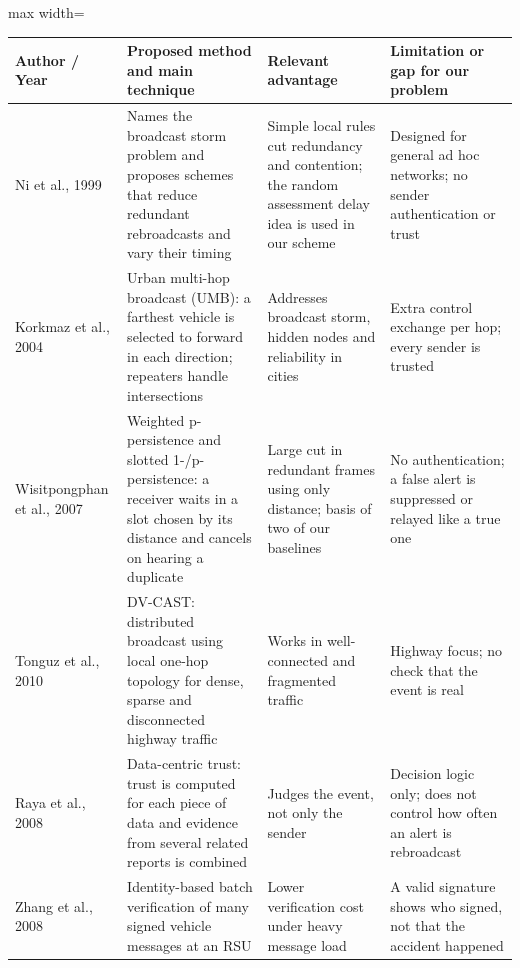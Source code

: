 \documentclass[11pt, a4paper]{article}
\begin{document}
\begin{table}[htbp]
\centering
\footnotesize
\renewcommand{\arraystretch}{1.25}
\begin{adjustbox}{max width=\textwidth}
\begin{tabular}{|>{\raggedright\arraybackslash}p{2.5cm}|>{\raggedright\arraybackslash}p{4.6cm}|>{\raggedright\arraybackslash}p{3.9cm}|>{\raggedright\arraybackslash}p{4.0cm}|}
\hline
\textbf{Author / Year} & \textbf{Proposed method and main technique} & \textbf{Relevant advantage} & \textbf{Limitation or gap for our problem} \\
\hline
Ni et al., 1999 \cite{ni1999broadcast} & Names the broadcast storm problem and proposes schemes that reduce redundant rebroadcasts and vary their timing & Simple local rules cut redundancy and contention; the random assessment delay idea is used in our scheme & Designed for general ad hoc networks; no sender authentication or trust \\
\hline
Korkmaz et al., 2004 \cite{korkmaz2004umb} & Urban multi-hop broadcast (UMB): a farthest vehicle is selected to forward in each direction; repeaters handle intersections & Addresses broadcast storm, hidden nodes and reliability in cities & Extra control exchange per hop; every sender is trusted \\
\hline
Wisitpongphan et al., 2007 \cite{wisitpongphan2007} & Weighted p-persistence and slotted 1-/p-persistence: a receiver waits in a slot chosen by its distance and cancels on hearing a duplicate & Large cut in redundant frames using only distance; basis of two of our baselines & No authentication; a false alert is suppressed or relayed like a true one \\
\hline
Tonguz et al., 2010 \cite{tonguz2010dvcast} & DV-CAST: distributed broadcast using local one-hop topology for dense, sparse and disconnected highway traffic & Works in well-connected and fragmented traffic & Highway focus; no check that the event is real \\
\hline
Raya et al., 2008 \cite{raya2008datacentric} & Data-centric trust: trust is computed for each piece of data and evidence from several related reports is combined & Judges the event, not only the sender & Decision logic only; does not control how often an alert is rebroadcast \\
\hline
Zhang et al., 2008 \cite{zhang2008batch} & Identity-based batch verification of many signed vehicle messages at an RSU & Lower verification cost under heavy message load & A valid signature shows who signed, not that the accident happened \\

\end{tabular}
\end{adjustbox}
\end{table}
\end{document}

